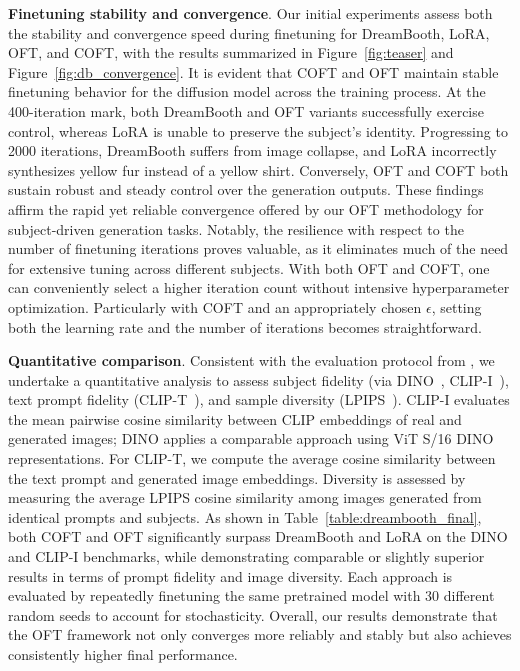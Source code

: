 {\textbf{Finetuning stability and convergence}. Our initial experiments assess both the stability and convergence speed during finetuning for DreamBooth, LoRA, OFT, and COFT, with the results summarized in Figure~\ref{fig:teaser} and Figure~\ref{fig:db_convergence}. It is evident that COFT and OFT maintain stable finetuning behavior for the diffusion model across the training process. At the 400-iteration mark, both DreamBooth and OFT variants successfully exercise control, whereas LoRA is unable to preserve the subject’s identity. Progressing to 2000 iterations, DreamBooth suffers from image collapse, and LoRA incorrectly synthesizes yellow fur instead of a yellow shirt. Conversely, OFT and COFT both sustain robust and steady control over the generation outputs. These findings affirm the rapid yet reliable convergence offered by our OFT methodology for subject-driven generation tasks. Notably, the resilience with respect to the number of finetuning iterations proves valuable, as it eliminates much of the need for extensive tuning across different subjects. With both OFT and COFT, one can conveniently select a higher iteration count without intensive hyperparameter optimization. Particularly with COFT and an appropriately chosen $\epsilon$, setting both the learning rate and the number of iterations becomes straightforward.

\textbf{Quantitative comparison}. Consistent with the evaluation protocol from \cite{ruiz2023dreambooth}, we undertake a quantitative analysis to assess subject fidelity (via DINO~\cite{caron2021emerging}, CLIP-I~\cite{radford2021learning}), text prompt fidelity (CLIP-T~\cite{radford2021learning}), and sample diversity (LPIPS~\cite{zhang2018unreasonable}). CLIP-I evaluates the mean pairwise cosine similarity between CLIP embeddings of real and generated images; DINO applies a comparable approach using ViT S/16 DINO representations. For CLIP-T, we compute the average cosine similarity between the text prompt and generated image embeddings. Diversity is assessed by measuring the average LPIPS cosine similarity among images generated from identical prompts and subjects. As shown in Table~\ref{table:dreambooth_final}, both COFT and OFT significantly surpass DreamBooth and LoRA on the DINO and CLIP-I benchmarks, while demonstrating comparable or slightly superior results in terms of prompt fidelity and image diversity. Each approach is evaluated by repeatedly finetuning the same pretrained model with 30 different random seeds to account for stochasticity. Overall, our results demonstrate that the OFT framework not only converges more reliably and stably but also achieves consistently higher final performance.

}
